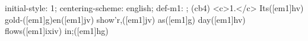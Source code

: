 initial-style: 1;
centering-scheme: english;
def-m1: \grealign;
(cb4) <c>1.</c> Its([em1]hv) gold-([em1]g)en([em1]jv) show'r,([em1]jv) as([em1]g) day([em1]hv) flows([em1]ixiv) in;([em1]hg)